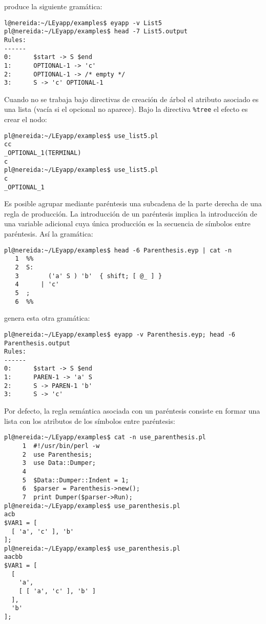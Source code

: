 produce la siguiente gramática:

\begin{verbatim}
l@nereida:~/LEyapp/examples$ eyapp -v List5
pl@nereida:~/LEyapp/examples$ head -7 List5.output
Rules:
------
0:      $start -> S $end
1:      OPTIONAL-1 -> 'c'
2:      OPTIONAL-1 -> /* empty */
3:      S -> 'c' OPTIONAL-1

\end{verbatim}

Cuando no se trabaja bajo directivas de creación de árbol
el atributo asociado es una lista (vacía si el opcional no
aparece).
Bajo la directiva \verb|%tree| el efecto es crear el nodo:

\begin{verbatim}
pl@nereida:~/LEyapp/examples$ use_list5.pl
cc
_OPTIONAL_1(TERMINAL)
c
pl@nereida:~/LEyapp/examples$ use_list5.pl
c
_OPTIONAL_1
\end{verbatim}


Es posible agrupar mediante paréntesis una subcadena de la parte derecha
de una regla de producción.  La introducción de un paréntesis implica 
la introducción de una variable adicional cuya única producción
es la secuencia de símbolos entre paréntesis. Así la gramática:

\begin{verbatim}
pl@nereida:~/LEyapp/examples$ head -6 Parenthesis.eyp | cat -n
   1  %%
   2  S:
   3        ('a' S ) 'b'  { shift; [ @_ ] }
   4      | 'c'
   5  ;
   6  %%
\end{verbatim}

genera esta otra gramática:

\begin{verbatim}
pl@nereida:~/LEyapp/examples$ eyapp -v Parenthesis.eyp; head -6 Parenthesis.output
Rules:
------
0:      $start -> S $end
1:      PAREN-1 -> 'a' S
2:      S -> PAREN-1 'b'
3:      S -> 'c'
\end{verbatim}

Por defecto, la regla semántica asociada con un paréntesis
consiste en formar una lista con los atributos
de los símbolos entre paréntesis:
\begin{verbatim}
pl@nereida:~/LEyapp/examples$ cat -n use_parenthesis.pl
     1  #!/usr/bin/perl -w
     2  use Parenthesis;
     3  use Data::Dumper;
     4
     5  $Data::Dumper::Indent = 1;
     6  $parser = Parenthesis->new();
     7  print Dumper($parser->Run);
pl@nereida:~/LEyapp/examples$ use_parenthesis.pl
acb
$VAR1 = [
  [ 'a', 'c' ], 'b'
];
pl@nereida:~/LEyapp/examples$ use_parenthesis.pl
aacbb
$VAR1 = [
  [
    'a',
    [ [ 'a', 'c' ], 'b' ]
  ],
  'b'
];
\end{verbatim}



